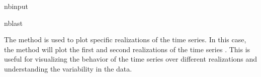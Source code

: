 \documentclass[a4paper,11pt,openany,english]{sphinxmanual}
\begin{document}
\begin{sphinxuseclass}{nbinput}
\begin{sphinxuseclass}{nblast}
{
\begin{sphinxVerbatim}[commandchars=\\\{\}]
\llap{\color{nbsphinxin}[2]:\,\hspace{\fboxrule}\hspace{\fboxsep}}    

\end{sphinxVerbatim}
}

\end{sphinxuseclass}
\end{sphinxuseclass}
\sphinxAtStartPar
The  method is used to plot specific realizations of the time series. In this case, the method will plot the first and second realizations of the time series . This is useful for visualizing the behavior of the time series over different realizations and understanding the variability in the data.
\end{document}
